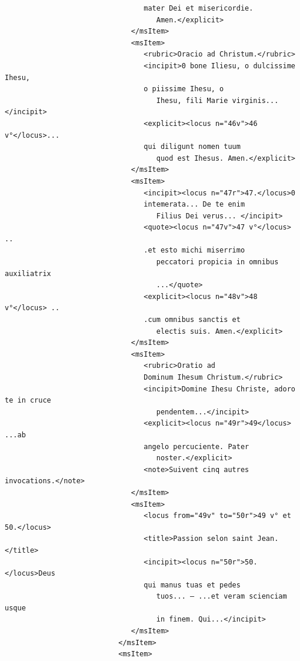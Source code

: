 \documentclass[a4paper,12pt,twoside]{book}
\begin{document}
\begin{verbatim}
                                 mater Dei et misericordie.
                                    Amen.</explicit>
                              </msItem>
                              <msItem>
                                 <rubric>Oracio ad Christum.</rubric>
                                 <incipit>0 bone Iliesu, o dulcissime Ihesu,
                                 o piissime Ihesu, o
                                    Ihesu, fili Marie virginis...</incipit>
                                 <explicit><locus n="46v">46 v°</locus>...
                                 qui diligunt nomen tuum
                                    quod est Ihesus. Amen.</explicit>
                              </msItem>
                              <msItem>
                                 <incipit><locus n="47r">47.</locus>0 
                                 intemerata... De te enim
                                    Filius Dei verus... </incipit>
                                 <quote><locus n="47v">47 v°</locus> ..
                                 .et esto michi miserrimo
                                    peccatori propicia in omnibus auxiliatrix
                                    ...</quote>
                                 <explicit><locus n="48v">48 v°</locus> ..
                                 .cum omnibus sanctis et
                                    electis suis. Amen.</explicit>
                              </msItem>
                              <msItem>
                                 <rubric>Oratio ad
                                 Dominum Ihesum Christum.</rubric>
                                 <incipit>Domine Ihesu Christe, adoro te in cruce
                                    pendentem...</incipit>
                                 <explicit><locus n="49r">49</locus> ...ab 
                                 angelo percuciente. Pater
                                    noster.</explicit>
                                 <note>Suivent cinq autres invocations.</note>
                              </msItem>
                              <msItem>
                                 <locus from="49v" to="50r">49 v° et 50.</locus>
                                 <title>Passion selon saint Jean.</title>
                                 <incipit><locus n="50r">50.</locus>Deus 
                                 qui manus tuas et pedes
                                    tuos... — ...et veram scienciam usque 
                                    in finem. Qui...</incipit>
                              </msItem>
                           </msItem>
                           <msItem>

\end{verbatim}
\end{document}
